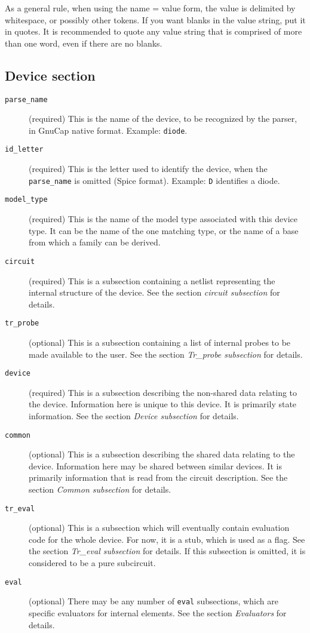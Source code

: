 As a general rule, when using the name = value form, the value is
delimited by whitespace, or possibly other tokens.  If you want blanks
in the value string, put it in quotes.  It is recommended to quote any
value string that is comprised of more than one word, even if there
are no blanks.
\subsection{Device section}

\begin{description}

\item[{\tt parse\_name}] (required)
This is the name of the device, to be recognized by the parser, in
GnuCap native format.  Example: {\tt diode}.

\item[{\tt id\_letter}] (required)
This is the letter used to identify the device, when the {\tt
parse\_name} is omitted (Spice format).  Example: {\tt D} identifies a
diode.

\item[{\tt model\_type}] (required)
This is the name of the model type associated with this device type.
It can be the name of the one matching type, or the name of a base
from which a family can be derived.

\item[{\tt circuit}] (required)
This is a subsection containing a netlist representing the internal
structure of the device.  See the section {\em circuit subsection} for
details.

\item[{\tt tr\_probe}] (optional)
This is a subsection containing a list of internal probes to be made
available to the user.  See the section {\em Tr\_probe subsection} for
details.

\item[{\tt device}] (required)
This is a subsection describing the non-shared data relating to the
device.  Information here is unique to this device.  It is primarily
state information.  See the section {\em Device subsection} for
details.

\item[{\tt common}] (optional)
This is a subsection describing the shared data relating to the device.
Information here may be shared between similar devices.  It is
primarily information that is read from the circuit description.  See
the section {\em Common subsection} for details.

\item[{\tt tr\_eval}] (optional)
This is a subsection which will eventually contain evaluation code for
the whole device.  For now, it is a stub, which is used as a flag.
See the section {\em Tr\_eval subsection} for details.  If this
subsection is omitted, it is considered to be a pure subcircuit.

\item[{\tt eval}] (optional)
There may be any number of {\tt eval} subsections, which are specific
evaluators for internal elements.  See the section {\em Evaluators}
for details.

\end{description}
